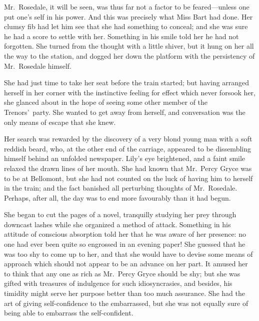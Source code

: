 \documentclass[12pt,a4paper]{book}
\begin{document}
Mr.\ Rosedale, it will be seen, was thus far not a factor to be
feared---unless one put one's self in his power. And this was
precisely what Miss Bart had done. Her clumsy fib had let him see
that she had something to conceal; and she was sure he had a
score to settle with her. Something in his smile told her
he had not forgotten. She turned from the thought with a little
shiver, but it hung on her all the way to the station, and dogged
her down the platform with the persistency of Mr.\ Rosedale
himself.





She had just time to take her seat before the train started; but
having arranged herself in her corner with the instinctive
feeling for effect which never forsook her, she glanced about in
the hope of seeing some other member of the Trenors'\ party. She
wanted to get away from herself, and conversation was the only
means of escape that she knew.





Her search was rewarded by the discovery of a very blond young
man with a soft reddish beard, who, at the other end of the
carriage, appeared to be dissembling himself behind an unfolded
newspaper. Lily's eye brightened, and a faint smile relaxed the
drawn lines of her mouth. She had known that Mr.\ Percy Gryce was
to be at Bellomont, but she had not counted on the luck of having
him to herself in the train; and the fact banished all perturbing
thoughts of Mr.\ Rosedale. Perhaps, after all, the day was to end
more favourably than it had begun.





She began to cut the pages of a novel, tranquilly studying her
prey through downcast lashes while she organized a method of
attack. Something in his attitude of conscious absorption told
her that he was aware of her presence: no one had ever been quite
so engrossed in an evening paper! She guessed that he was too shy
to come up to her, and that she would have to devise some means
of approach which should not appear to be an advance on her part. 
It amused her to think that any one as rich as Mr.\ Percy Gryce
should be shy; but she was gifted with treasures of indulgence
for such idiosyncrasies, and besides, his timidity might serve
her purpose better than too much assurance. She had the art of
giving self-confidence to the embarrassed, but she was not
equally sure of being able to embarrass the self-confident.
\end{document}
